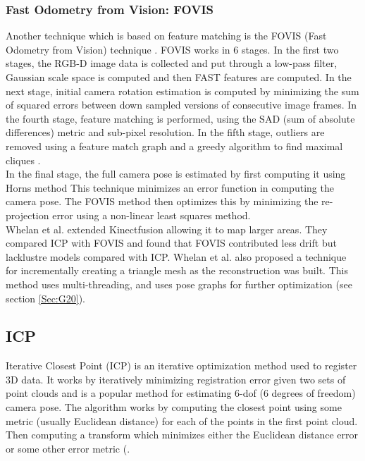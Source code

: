 \subsubsection{Fast Odometry from Vision: FOVIS}

Another technique which is based on feature matching is the FOVIS (Fast Odometry from Vision) technique \cite{Huang17Visual}. FOVIS works in 6 stages. In the first two stages, the RGB-D image data is collected and put through a low-pass filter, Gaussian scale space is computed and then FAST features \cite{Rosten06Machine,Rosten05Fusing} are computed. In the next stage, initial camera rotation estimation is computed by minimizing the sum of squared errors between down sampled versions of consecutive image frames. In the fourth stage, feature matching is performed, using the SAD (sum of absolute differences) metric and sub-pixel resolution. In the fifth stage, outliers are removed using a feature match graph and a greedy algorithm to find maximal cliques \cite{Hirschmuller02Fast,Howard08Real}. \\

In the final stage, the full camera pose is estimated by first computing it using Horns method \cite{Horn87Closed} This technique minimizes an error function in computing the camera pose. The FOVIS method then optimizes this by minimizing the re-projection error using a non-linear least squares method. \\

Whelan et al. \cite{Whelan12Kintinuous} extended Kinectfusion allowing it to map larger areas. They compared ICP with FOVIS and found that FOVIS contributed less drift but lacklustre models compared with ICP. Whelan et al. also proposed a technique for incrementally creating a triangle mesh as the reconstruction was built. This method uses multi-threading, and uses pose graphs for further optimization (see section \ref{Sec:G20}).

\subsection{ICP}

\label{ICPSection}

Iterative Closest Point (ICP) \cite{Besl92Method,Rusinkiewicz01Efficient,Segal09Generalized} is an iterative optimization method used to register 3D data. It works by iteratively minimizing registration error given two sets of point clouds and is a popular method for estimating 6-dof (6 degrees of freedom) camera pose. The algorithm works by computing the closest point using some metric (usually Euclidean distance) for each of the points in the first point cloud. Then computing a transform which minimizes either the Euclidean distance error or some other error metric (\cite{Steinbrucker11Real,Tykkala11Direct,Kerl13Robust,Chen92Object,Stuckler12Robust}. \\

